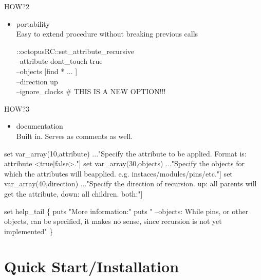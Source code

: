\documentclass[handout]{beamer}
\begin{document}
\begin{frame}[fragile]{HOW?}{2}
	\begin{itemize}
	\item \alert{portability} \\
	Easy to extend procedure without breaking previous calls\\
	\begin{semiverbatim}
	::octopusRC::set_attribute_recursive \\
	    --attribute dont_touch true \\
	    --objects [find * ... ] \\
	    --direction up \\
	    \alert{--ignore_clocks} # THIS IS A NEW OPTION!!!
	\end{semiverbatim}
	\end{itemize}
\end{frame}
\begin{frame}[fragile]{HOW?}{3}
	\begin{itemize}
	\item \alert{documentation}\\
	Built in. Serves as comments as well.\\
	\end{itemize}
	{\tiny
	\begin{semiverbatim}
set var_array(10,attribute) ..."\alert{Specify the attribute to be applied. Format is: attribute <true|false>.}"]
set var_array(30,objects)   ..."\alert{Specify the objects for which the attributes will beapplied. e.g. instaces/modules/pins/etc.}"]
set var_array(40,direction) ..."\alert{Specify the direction of recursion. up: all parents will get the attribute, down: all children. both:}"]

set help_tail \{
        puts "\alert{More information:}" 
        puts "\alert{    --objects:   While pins, or other objects, can be specified, it makes no sense, since recursion is not yet implemented}"
\}
	\end{semiverbatim}
	}
\end{frame}

\section{Quick Start/Installation}
\end{document}
